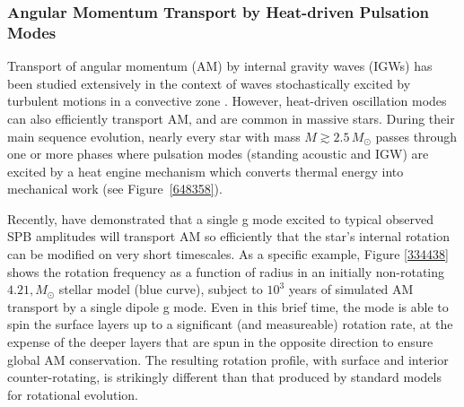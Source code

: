 
\subsubsection{Angular Momentum Transport by Heat-driven Pulsation Modes}

Transport of angular momentum (AM) by internal gravity waves (IGWs) has been studied extensively in the context of waves stochastically excited by turbulent motions in a convective zone \citep[e.g.,][]{Schatzman:1993,Kumar:1997,Zahn:1997,Talon:2002,Talon:2005,Rogers:2008aa,Rogers:2013,Lee:2014,Rogers:2015}. However, heat-driven oscillation modes can also efficiently transport AM, and are common in massive stars. During their main sequence evolution, nearly every star with mass $M \gtrsim 2.5\,M_{\odot}$ passes through one or more phases where pulsation modes (standing acoustic and IGW) are excited by a heat engine mechanism which converts thermal energy into mechanical work (see Figure~\ref{648358}).


Recently, \citet{Townsend:2017} have demonstrated that a single g mode excited to typical observed SPB amplitudes will transport AM so efficiently that the star's internal rotation can be modified on very short timescales. As a specific example, Figure \ref{334438} shows the rotation frequency as a function of radius in an initially non-rotating $4.21,M_{\odot}$ stellar model (blue curve), subject to $10^3$ years of simulated AM transport by a single dipole g mode. Even in this brief time, the mode is able to spin the surface layers up to a significant (and measureable) rotation rate, at the expense of the deeper layers that are spun in the opposite direction to ensure global AM conservation. The resulting rotation profile, with surface and interior counter-rotating, is strikingly different than that produced by standard models for rotational evolution.


